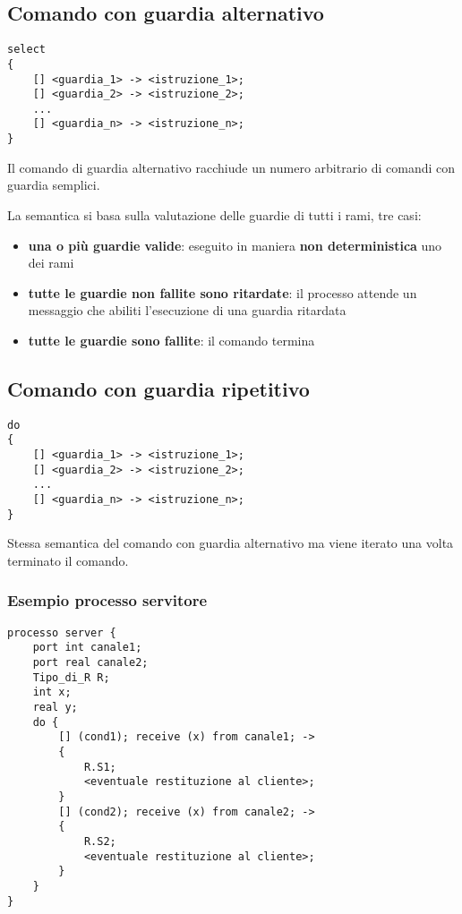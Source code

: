 \subsection{Comando con guardia alternativo}
\begin{verbatim}
select
{
    [] <guardia_1> -> <istruzione_1>;
    [] <guardia_2> -> <istruzione_2>;
    ...
    [] <guardia_n> -> <istruzione_n>;
}
\end{verbatim}

Il comando di guardia alternativo racchiude un numero arbitrario di comandi con guardia semplici.

La semantica si basa sulla valutazione delle guardie di tutti i rami, tre casi:
\begin{itemize}
    \item \textbf{una o più guardie valide}: eseguito in maniera \textbf{non deterministica} uno dei rami
    \item \textbf{tutte le guardie non fallite sono ritardate}: il processo attende un messaggio che abiliti l'esecuzione di una guardia ritardata
    \item \textbf{tutte le guardie sono fallite}: il comando termina
\end{itemize}

\subsection{Comando con guardia ripetitivo}
\begin{verbatim}
do
{
    [] <guardia_1> -> <istruzione_1>;
    [] <guardia_2> -> <istruzione_2>;
    ...
    [] <guardia_n> -> <istruzione_n>;
}
\end{verbatim}

Stessa semantica del comando con guardia alternativo ma viene iterato una volta terminato il comando.

\subsubsection{Esempio processo servitore}
\begin{verbatim}
processo server {
    port int canale1;
    port real canale2;
    Tipo_di_R R;
    int x;
    real y;
    do {
        [] (cond1); receive (x) from canale1; ->
        {
            R.S1;
            <eventuale restituzione al cliente>;
        }
        [] (cond2); receive (x) from canale2; ->
        {
            R.S2;
            <eventuale restituzione al cliente>;
        }
    }
}
\end{verbatim}

